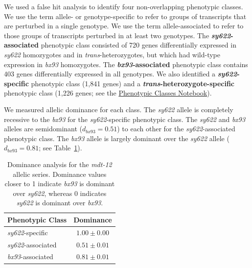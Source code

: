 \documentclass[8pt, twocolumn]{article}
\newcommand{\gene}[1]{\mbox{\emph{#1}}}
\newcommand{\dpy}{\gene{mdt-12}}
\begin{document}
We used a false hit analysis to identify four non-overlapping phenotypic
classes. We use the term allele- or genotype-specific to refer to groups of
transcripts that are perturbed in a single genotype. We use the term
allele-associated to refer to those groups of transcripts  perturbed in at least
two genotypes. The \textbf{\emph{sy622}-associated} phenotypic class consisted
of 720 genes differentially expressed in \emph{sy622} homozygotes and in
\emph{trans}-heterozygotes, but which had wild-type expression in \emph{bx93}
homozygotes. The \textbf{\emph{bx93}-associated} phenotypic class contains 403
genes differentially expressed in all genotypes. We also identified a
\textbf{\emph{sy622}-specific} phenotypic class (1,841 genes) and a
\textbf{\emph{trans}-heterozygote-specific} phenotypic class (1,226 genes; see
the
\href{https://wormlabcaltech.github.io/med-cafe/notebook/phenotypic_classes.html}{
Phenotypic Classes Notebook}).

We measured allelic dominance for each class. The \emph{sy622} allele is
completely recessive to the \emph{bx93} for the \emph{sy622}-specific phenotypic
class. The \emph{sy622} and \emph{bx93} alleles are semidominant ($d_{bx93} =
0.51$) to each other for the \emph{sy622}-associated phenotypic class. The
\emph{bx93} allele is largely  dominant over the \emph{sy622} allele
($d_{bx93}=0.81$; see Table~\ref{tab:dom}).

\begin{table}
  \centering
  \begin{tabular}{lc}
    \toprule
    Phenotypic Class & Dominance\\
    \midrule
    \emph{sy622}-specific & $1.00\pm0.00$\\
    \emph{sy622}-associated & $0.51\pm0.01$\\
    \emph{bx93}-associated & $0.81\pm0.01$\\
    \bottomrule
  \end{tabular}
  \caption{Dominance analysis for the \dpy{} allelic series. Dominance values
  closer to 1 indicate \emph{bx93} is dominant over \emph{sy622}, whereas 0
  indicates \emph{sy622} is dominant over \emph{bx93}.}
\label{tab:dom}

\end{table}
\end{document}
